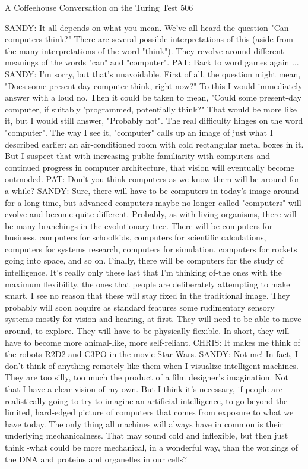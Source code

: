 A Coffeehouse Conversation on the Turing Test                                      506

SANDY: It all depends on what you mean. We've all heard the question "Can
   computers think?" There are several possible interpretations of this (aside from
   the many interpretations of the word "think"). They revolve around different
   meanings of the words "can" and "computer".
PAT: Back to word games again ...
SANDY: I'm sorry, but that's unavoidable. First of all, the question might mean,
   "Does some present-day computer think, right now?" To this I would
   immediately answer with a loud no. Then it could be taken to mean, "Could some
   present-day computer, if suitably 'programmed, potentially think?" That would
   be more like it, but I would still answer, "Probably not". The real difficulty
   hinges on the word "computer". The way I see it, "computer" calls up an image
   of just what I described earlier: an air-conditioned room with cold rectangular
   metal boxes in it. But I suspect that with increasing public familiarity with
   computers and continued progress in computer architecture, that vision will
   eventually become outmoded.
PAT: Don't you think computers as we know them will be around for a while?
SANDY: Sure, there will have to be computers in today's image around for a long
   time, but advanced computers-maybe no longer called "computers"-will evolve
   and become quite different. Probably, as with living organisms, there will be
   many branchings in the evolutionary tree. There will be computers for business,
   computers for schoolkids, computers for scientific calculations, computers for
   systems research, computers for simulation, computers for rockets going into
   space, and so on. Finally, there will be computers for the study of intelligence.
   It's really only these last that I'm thinking of-the ones with the maximum
   flexibility, the ones that people are deliberately attempting to make smart. I see
   no reason that these will stay fixed in the traditional image. They probably will
   soon acquire as standard features some rudimentary sensory systems-mostly for
   vision and hearing, at first. They will need to be able to move around, to explore.
   They will have to be physically flexible. In short, they will have to become more
   animal-like, more self-reliant.
CHRIS: It makes me think of the robots R2D2 and C3PO in the movie Star Wars.
SANDY: Not me! In fact, I don't think of anything remotely like them when I
   visualize intelligent machines. They are too silly, too much the product of a film
   designer's imagination. Not that I have a clear vision of my own. But I think it's
   necessary, if people are realistically going to try to imagine an artificial
   intelligence, to go beyond the limited, hard-edged picture of computers that
   comes from exposure to what we have today. The only thing all machines will
   always have in common is their underlying mechanicalness. That may sound cold
   and inflexible, but then just think -what could be more mechanical, in a
   wonderful way, than the workings of the DNA and proteins and organelles in our
   cells?




